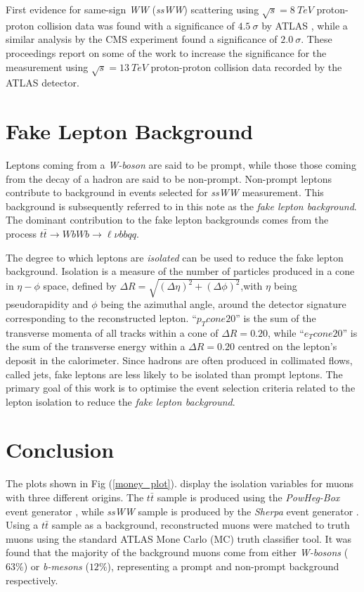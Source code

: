 \documentclass[a4paper]{jpconf}
\begin{document}
First evidence for same-sign \emph{WW} (\emph{ssWW}) scattering using $\sqrt{s} = 8 \ TeV$ proton-proton collision data was found with a significance of $4.5 \ \sigma$ by ATLAS \cite{atlas_result}, while a similar analysis by the CMS experiment \cite{cms_result} found a significance of $2.0 \ \sigma$. These proceedings report on some of the work to increase the significance for the measurement using $\sqrt{s} = 13 \ TeV$ proton-proton collision data recorded by the ATLAS detector.
\section{Fake Lepton Background}
Leptons coming from a \emph{W-boson} are said to be prompt, while those those coming from the decay of a hadron are said to be non-prompt.  Non-prompt leptons contribute to background in events selected for \emph{ssWW} measurement. This background is subsequently referred to in this note as the \emph{fake lepton background}. The dominant contribution to the fake lepton backgrounds comes from the process $t\bar{t} \longrightarrow WbWb \longrightarrow \ell\nu bb qq$.

The degree to which leptons are \emph{isolated} can be used to reduce the fake lepton background. Isolation is a measure of the number of particles produced in a cone in $\eta - \phi$ space, defined by $\Delta R = \sqrt{(\Delta\eta)^{2} + (\Delta\phi)^{2}}$,with $\eta$ being pseudorapidity and $\phi$ being the azimuthal angle, around the detector signature corresponding to the reconstructed lepton. ``$p_{T}cone20$'' is the sum of the transverse momenta of all tracks within a cone of $\Delta R = 0.20$, while ``$e_{T}cone20$'' is the sum of the transverse energy within a $\Delta R = 0.20$ centred on the lepton's deposit in the calorimeter. Since hadrons are often produced in collimated flows, called jets, fake leptons are less likely to be isolated than prompt leptons. The primary goal of this work is to optimise the event selection criteria related to the lepton isolation to reduce the \emph{fake lepton background}.
\section{Conclusion}
The plots shown in Fig (\ref{money_plot}). display the isolation variables for muons with three different origins. The $t\bar{t}$ sample is produced using the \emph{PowHeg-Box} event generator \cite{powheg}, while \emph{ssWW} sample is produced by the \emph{Sherpa} event generator \cite{sherpa}. Using a $t\bar{t}$ sample as a background, reconstructed muons were matched to truth muons using the standard ATLAS Mone Carlo (MC) truth classifier tool. It was found that the majority of the background muons come from either \emph{W-bosons} ($63\%$) or \emph{b-mesons} ($12\%$), representing a prompt and non-prompt background respectively.
\end{document}
